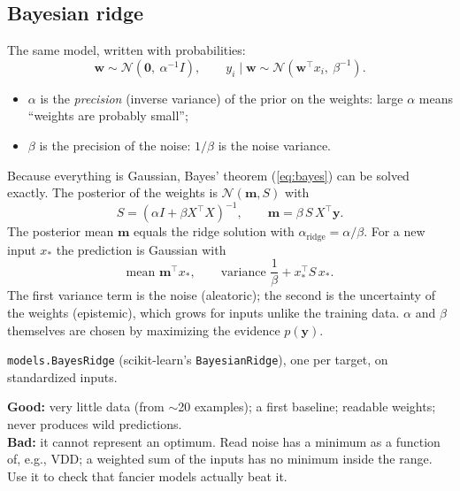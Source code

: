 \documentclass[11pt]{article}
\newcommand{\code}[1]{\texttt{#1}}
\newcommand{\N}{\mathcal{N}}
\begin{document}
\subsection{Bayesian ridge}
The same model, written with probabilities:
\begin{equation}
\bm w \sim \N(\bm 0,\ \alpha^{-1}I),\qquad y_i \mid \bm w \sim \N(\bm w^\top x_i,\ \beta^{-1}).
\end{equation}
\begin{itemize}
\item $\alpha$ is the \emph{precision} (inverse variance) of the prior on the weights: large $\alpha$ means ``weights are probably
  small'';
\item $\beta$ is the precision of the noise: $1/\beta$ is the noise variance.
\end{itemize}
Because everything is Gaussian, Bayes' theorem (\ref{eq:bayes}) can be solved exactly. The posterior of the weights is
$\N(\bm m, S)$ with
\begin{equation}
S = (\alpha I + \beta X^\top X)^{-1},\qquad \bm m = \beta\,S\,X^\top\bm y .
\end{equation}
The posterior mean $\bm m$ equals the ridge solution with $\alpha_\text{ridge} = \alpha/\beta$. For a new input $x_*$ the prediction
is Gaussian with
\begin{equation}
\text{mean } \bm m^\top x_*,\qquad \text{variance } \frac1\beta + x_*^\top S\,x_* .
\end{equation}
The first variance term is the noise (aleatoric); the second is the uncertainty of the weights (epistemic), which grows for inputs
unlike the training data. $\alpha$ and $\beta$ themselves are chosen by maximizing the evidence $p(\bm y)$.

\begin{ours}
\code{models.BayesRidge} (scikit-learn's \code{BayesianRidge}), one per target, on standardized inputs.
\end{ours}

\begin{when}
\textbf{Good:} very little data (from $\sim$20 examples); a first baseline; readable weights; never produces wild predictions.\\
\textbf{Bad:} it cannot represent an optimum. Read noise has a minimum as a function of, e.g., VDD; a weighted sum of the inputs has
no minimum inside the range. Use it to check that fancier models actually beat it.
\end{when}

\end{document}

